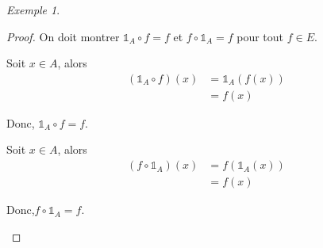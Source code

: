 \documentclass{report}
\newcommand*{\identite}{\mathds{1}}
\theoremstyle{definition}
\theoremstyle{remark}
\newtheorem*{exem}{Exemple}
\begin{document}
\begin{exem}
\begin{ulist}
\begin{proof}
				On doit montrer $\identite_A \circ f=f$ et $f \circ \identite_A=f$ pour tout $f \in E$.
				\begin{nlist}
					\item Soit $x \in A$, alors
					\begin{align*}
						(\identite_A \circ f)(x)&= \identite_A(f(x))\\
						&= f(x)
					\end{align*}

					Donc, $\identite_A \circ f=f$.
					\item Soit $x \in A$, alors
					\begin{align*}
						(f \circ \identite_A)(x)&= f(\identite_A(x))\\
						&=f(x)
					\end{align*}

					Donc,$f \circ \identite_A=f$.
				\end{nlist}
			\end{proof}
		\end{ulist}
	\end{exem}
\end{document}
